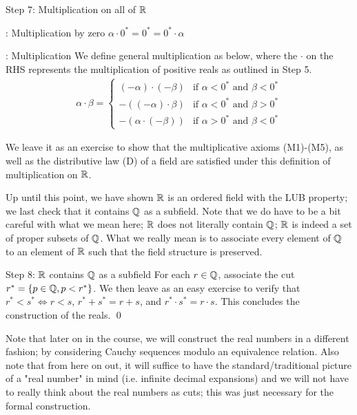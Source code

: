 \begin{nblank}{Step 7: Multiplication on all of $\mathbb{R}$}
    \begin{ndef}{: Multiplication by zero}
        $\alpha \cdot 0^* = 0^* = 0^* \cdot \alpha$
    \end{ndef}
    \begin{ndef}{: Multiplication}
        We define general multiplication as below, where the $\cdot$ on the RHS represents the multiplication of positive reals as outlined in Step 5. 
        \begin{align*}
            \alpha \cdot \beta = 
            \begin{cases}
            (-\alpha)\cdot(-\beta) & \text{if $\alpha < 0^*$ and $\beta < 0^*$}
            \\ -\left((-\alpha)\cdot\beta\right) & \text{if $\alpha < 0^*$ and $\beta > 0^*$}
            \\ -\left(\alpha \cdot (-\beta)\right) & \text{if $\alpha > 0^*$ and $\beta < 0^*$}
            \end{cases}
        \end{align*}
    \end{ndef}
    We leave it as an exercise to show that the multiplicative axioms (M1)-(M5), as well as the distributive law (D) of a field are satisfied under this definition of multiplication on $\mathbb{R}$. 
\end{nblank}
\noindent Up until this point, we have shown $\mathbb{R}$ is an ordered field with the LUB property; we last check that it contains $\mathbb{Q}$ as a subfield. Note that we do have to be a bit careful with what we mean here; $\mathbb{R}$ does not literally contain $\mathbb{Q}$; $\mathbb{R}$ is indeed a set of proper subsets of $\mathbb{Q}$. What we really mean is to associate every element of $\mathbb{Q}$ to an element of $\mathbb{R}$ such that the field structure is preserved. 
\begin{nblank}{Step 8: $\mathbb{R}$ contains $\mathbb{Q}$ as a subfield}
    For each $r \in \mathbb{Q}$, associate the cut $r^* = \set{p \in \mathbb{Q}, p < r^*}$. We then leave as an easy exercise to verify that $r^* < s^* \iff r < s$, $r^* + s^* = r + s$, and $r^*\cdot s^* = r\cdot s$. This concludes the construction of the reals. \qed
\end{nblank}
\noindent Note that later on in the course, we will construct the real numbers in a different fashion; by considering Cauchy sequences modulo an equivalence relation. Also note that from here on out, it will suffice to have the standard/traditional picture of a "real number" in mind (i.e. infinite decimal expansions) and we will not have to really think about the real numbers as cuts; this was just necessary for the formal construction.

